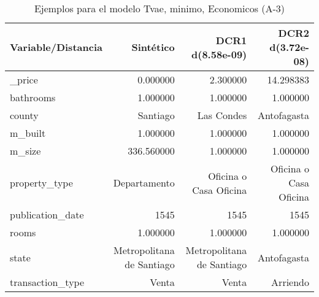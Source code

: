 \begin{table}[H]
\centering
\fontsize{10}{14}\selectfont
\caption{Ejemplos para el modelo Tvae, minimo, Economicos (A-3)}
\label{table-example-economicos-a-3-tvae-min}
\begin{tabular}{|l|r|r|r|}
\hline
\rowcolor[gray]{0.8}
Variable/Distancia & Sintético & DCR1 d(8.58e-09) & DCR2 d(3.72e-08) \\
\hline \_price & \cellcolor[rgb]{0.9, 0.54, 0.52} 0.000000 & 2.300000 & 14.298383 \\
\hline bathrooms & \cellcolor[rgb]{0.9, 0.54, 0.52} 1.000000 & \cellcolor[rgb]{0.9, 0.54, 0.52} 1.000000 & \cellcolor[rgb]{0.9, 0.54, 0.52} 1.000000 \\
\hline county & \cellcolor[rgb]{0.9, 0.54, 0.52} Santiago & Las Condes & Antofagasta \\
\hline m\_built & \cellcolor[rgb]{0.9, 0.54, 0.52} 1.000000 & \cellcolor[rgb]{0.9, 0.54, 0.52} 1.000000 & \cellcolor[rgb]{0.9, 0.54, 0.52} 1.000000 \\
\hline m\_size & \cellcolor[rgb]{0.9, 0.54, 0.52} 336.560000 & 1.000000 & 1.000000 \\
\hline property\_type & \cellcolor[rgb]{0.9, 0.54, 0.52} Departamento & Oficina o Casa Oficina & Oficina o Casa Oficina \\
\hline publication\_date & \cellcolor[rgb]{0.9, 0.54, 0.52} 1545 & \cellcolor[rgb]{0.9, 0.54, 0.52} 1545 & \cellcolor[rgb]{0.9, 0.54, 0.52} 1545 \\
\hline rooms & \cellcolor[rgb]{0.9, 0.54, 0.52} 1.000000 & \cellcolor[rgb]{0.9, 0.54, 0.52} 1.000000 & \cellcolor[rgb]{0.9, 0.54, 0.52} 1.000000 \\
\hline state & \cellcolor[rgb]{0.9, 0.54, 0.52} Metropolitana de Santiago & \cellcolor[rgb]{0.9, 0.54, 0.52} Metropolitana de Santiago & Antofagasta \\
\hline transaction\_type & \cellcolor[rgb]{0.9, 0.54, 0.52} Venta & \cellcolor[rgb]{0.9, 0.54, 0.52} Venta & Arriendo \\
\hline
\end{tabular}
\end{table}
